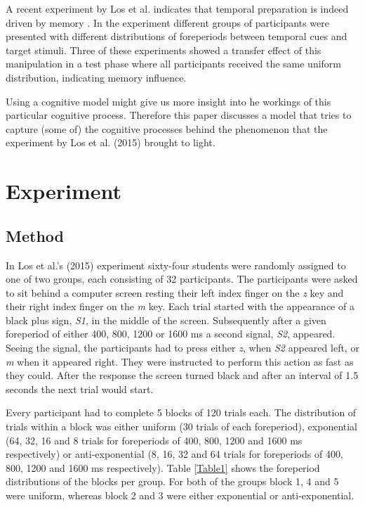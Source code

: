 \documentclass[10pt,letterpaper]{article}
\begin{document}
A recent experiment by Los et al. indicates that temporal preparation is indeed driven by memory \cite{Los2}. In the experiment different groups of participants were presented with different distributions of foreperiods between temporal cues and target stimuli. Three of these experiments showed a transfer effect of this manipulation in a test phase where all participants received the same uniform distribution, indicating memory influence. 

Using a cognitive model might give us more insight into he workings of this particular cognitive process. Therefore this paper discusses a model that tries to capture (some of) the cognitive processes behind the phenomenon that the experiment by Los et al. (2015) brought to light.

\section{Experiment}
\subsection{Method}
In Los et al.'s (2015) experiment sixty-four students were randomly assigned to one of two groups, each consisting of 32 participants. The participants were asked to sit behind a computer screen resting their left index finger on the \textit{z} key and their right index finger on the \textit{m} key. Each trial started with the appearance of a black plus sign, \textit{S1}, in the middle of the screen. Subsequently after a given foreperiod of either 400, 800, 1200 or 1600 ms a second signal, \textit{S2}, appeared. Seeing the signal, the participants had to press either \textit{z}, when \textit{S2} appeared left, or \textit{m} when it appeared right. They were instructed to perform this action as fast as they could. After the response the screen turned black and after an interval of 1.5 seconds the next trial would start.

Every participant had to complete 5 blocks of 120 trials each. The distribution of trials within a block was either uniform (30 trials of each foreperiod), exponential (64, 32, 16 and 8 trials for foreperiods of 400, 800, 1200 and 1600 ms respectively) or anti-exponential (8, 16, 32 and 64 trials for foreperiods of 400, 800, 1200 and 1600 ms respectively). Table \ref{Table1} shows the foreperiod distributions of the blocks per group. For both of the groups block 1, 4 and 5 were uniform, whereas block 2 and 3 were either exponential or anti-exponential.
\end{document}
